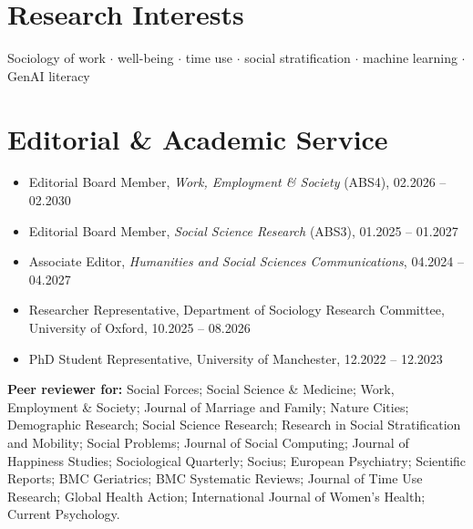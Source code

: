 \documentclass[11pt,a4paper]{article}
\begin{document}
\section*{Research Interests}
Sociology of work $\cdot$ well-being $\cdot$ time use $\cdot$ social stratification $\cdot$ machine learning $\cdot$ GenAI literacy

\section*{Editorial \& Academic Service}
\begin{itemize}
\item Editorial Board Member, \textit{Work, Employment \& Society} (ABS4), 02.2026 -- 02.2030
\item Editorial Board Member, \textit{Social Science Research} (ABS3), 01.2025 -- 01.2027
\item Associate Editor, \textit{Humanities and Social Sciences Communications}, 04.2024 -- 04.2027
\item Researcher Representative, Department of Sociology Research Committee, University of Oxford, 10.2025 -- 08.2026
\item PhD Student Representative, University of Manchester, 12.2022 -- 12.2023
\end{itemize}

\textbf{Peer reviewer for:} Social Forces; Social Science \& Medicine; Work, Employment \& Society; Journal of Marriage and Family; Nature Cities; Demographic Research; Social Science Research; Research in Social Stratification and Mobility; Social Problems; Journal of Social Computing; Journal of Happiness Studies; Sociological Quarterly; Socius; European Psychiatry; Scientific Reports; BMC Geriatrics; BMC Systematic Reviews; Journal of Time Use Research; Global Health Action; International Journal of Women's Health; Current Psychology.

\end{document}
